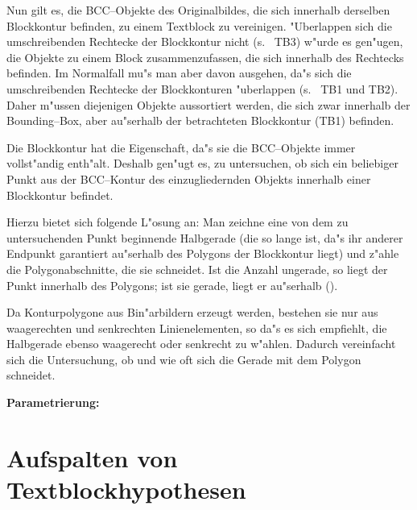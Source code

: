 
Nun gilt es, die BCC--Objekte des Originalbildes, die sich innerhalb derselben Blockkontur befinden, zu einem Textblock zu vereinigen.
"Uberlappen sich die umschreibenden Rechtecke der Blockkontur nicht
(s.\  TB3) w"urde es gen"ugen, die Objekte zu einem Block
zusammenzufassen, die sich innerhalb des
Rechtecks befinden. Im Normalfall mu"s man aber davon ausgehen, da"s sich die umschreibenden
Rechtecke der Blockkonturen "uberlappen (s.\  TB1 und TB2).
Daher m"ussen diejenigen Objekte aussortiert werden,
die sich zwar innerhalb der Bounding--Box, aber au"serhalb der betrachteten Blockkontur (TB1) befinden.


Die Blockkontur hat die Eigenschaft, da"s sie die BCC--Objekte immer vollst"andig enth"alt.
Deshalb gen"ugt es, zu untersuchen, ob sich ein beliebiger Punkt aus der BCC--Kontur des
einzugliedernden Objekts innerhalb einer Blockkontur befindet.

Hierzu bietet sich folgende L"osung an:
Man zeichne eine von dem zu untersuchenden Punkt beginnende Halbgerade
(die so lange ist, da"s ihr anderer Endpunkt garantiert au"serhalb des Polygons der Blockkontur
liegt) und z"ahle die Polygonabschnitte, die sie schneidet.
Ist die Anzahl ungerade, so liegt der Punkt innerhalb des Polygons; ist sie gerade,
liegt er au"serhalb ().


Da Konturpolygone aus Bin"arbildern erzeugt werden, bestehen sie nur aus
waagerechten und senkrechten Linienelementen, so da"s es sich empfiehlt, die Halbgerade ebenso
waagerecht oder senkrecht zu w"ahlen. Dadurch vereinfacht sich die Untersuchung, ob und wie
oft sich die Gerade mit dem Polygon schneidet.

  {\bf Parametrierung:}


\clearpage
\section{Aufspalten von Textblockhypothesen}

